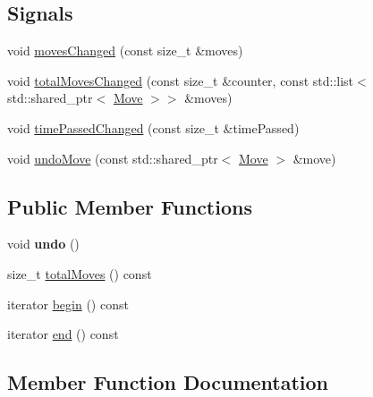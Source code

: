 \subsection*{Signals}
\begin{DoxyCompactItemize}
\item 
void \mbox{\hyperlink{class_move_stack_model_aff05dc88104b96911f9cf8a1033d4356}{moves\+Changed}} (const size\+\_\+t \&moves)
\item 
void \mbox{\hyperlink{class_move_stack_model_a8b596d9619735fc7d066a3d0e1b8cc55}{total\+Moves\+Changed}} (const size\+\_\+t \&counter, const std\+::list$<$ std\+::shared\+\_\+ptr$<$ \mbox{\hyperlink{struct_move}{Move}} $>$$>$ \&moves)
\item 
void \mbox{\hyperlink{class_move_stack_model_aa7d3186093032e523b2a7bbefa74f8fb}{time\+Passed\+Changed}} (const size\+\_\+t \&time\+Passed)
\item 
void \mbox{\hyperlink{class_move_stack_model_a16436cf5acda5455355c24f28586f1e8}{undo\+Move}} (const std\+::shared\+\_\+ptr$<$ \mbox{\hyperlink{struct_move}{Move}} $>$ \&move)
\end{DoxyCompactItemize}
\subsection*{Public Member Functions}
\begin{DoxyCompactItemize}
\item 
\mbox{\label{class_move_stack_model_a10ab990b00c1eb0d543d75b8b07eb4bf}} 
void {\bfseries undo} ()
\item 
size\+\_\+t \mbox{\hyperlink{class_move_stack_model_a59f08def53913e4f33df7fe30a16dc75}{total\+Moves}} () const
\item 
iterator \mbox{\hyperlink{class_move_stack_model_a5617b792b9e541940f6bfdbcc3c08bfa}{begin}} () const
\item 
iterator \mbox{\hyperlink{class_move_stack_model_aa4d30bfd992058342c0faff6ab5492b9}{end}} () const
\end{DoxyCompactItemize}


\subsection{Member Function Documentation}
\mbox{\label{class_move_stack_model_a5617b792b9e541940f6bfdbcc3c08bfa}} 
